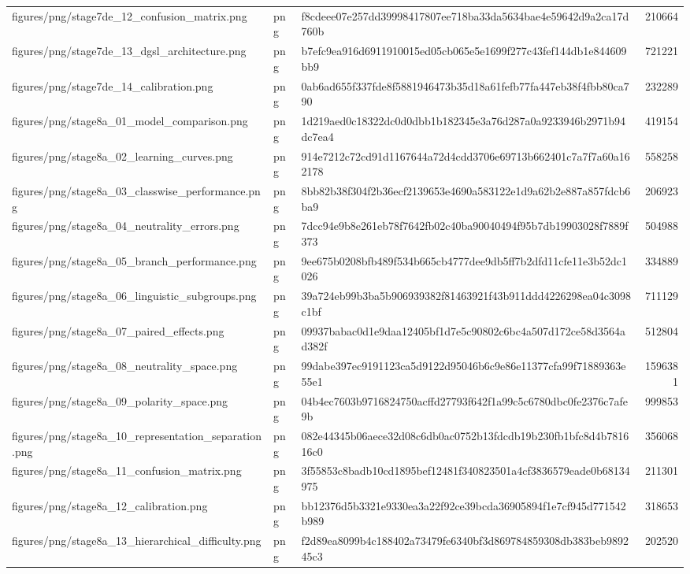 \begin{tabular}{lllr}
figures/png/stage7de_12_confusion_matrix.png & png & f8cdeee07e257dd39998417807ee718ba33da5634bae4e59642d9a2ca17d760b & 210664 \\
figures/png/stage7de_13_dgsl_architecture.png & png & b7efc9ea916d6911910015ed05cb065e5e1699f277c43fef144db1e844609bb9 & 721221 \\
figures/png/stage7de_14_calibration.png & png & 0ab6ad655f337fde8f5881946473b35d18a61fefb77fa447eb38f4fbb80ca790 & 232289 \\
figures/png/stage8a_01_model_comparison.png & png & 1d219aed0c18322dc0d0dbb1b182345e3a76d287a0a9233946b2971b94dc7ea4 & 419154 \\
figures/png/stage8a_02_learning_curves.png & png & 914e7212c72cd91d1167644a72d4cdd3706e69713b662401c7a7f7a60a162178 & 558258 \\
figures/png/stage8a_03_classwise_performance.png & png & 8bb82b38f304f2b36ecf2139653e4690a583122e1d9a62b2e887a857fdcb6ba9 & 206923 \\
figures/png/stage8a_04_neutrality_errors.png & png & 7dcc94e9b8e261eb78f7642fb02c40ba90040494f95b7db19903028f7889f373 & 504988 \\
figures/png/stage8a_05_branch_performance.png & png & 9ee675b0208bfb489f534b665cb4777dee9db5ff7b2dfd11cfe11e3b52dc1026 & 334889 \\
figures/png/stage8a_06_linguistic_subgroups.png & png & 39a724eb99b3ba5b906939382f81463921f43b911ddd4226298ea04c3098c1bf & 711129 \\
figures/png/stage8a_07_paired_effects.png & png & 09937babac0d1e9daa12405bf1d7e5c90802c6bc4a507d172ce58d3564ad382f & 512804 \\
figures/png/stage8a_08_neutrality_space.png & png & 99dabe397ec9191123ca5d9122d95046b6c9e86e11377cfa99f71889363e55e1 & 1596381 \\
figures/png/stage8a_09_polarity_space.png & png & 04b4ec7603b9716824750acffd27793f642f1a99c5c6780dbc0fe2376c7afe9b & 999853 \\
figures/png/stage8a_10_representation_separation.png & png & 082e44345b06aece32d08c6db0ac0752b13fdcdb19b230fb1bfc8d4b781616c0 & 356068 \\
figures/png/stage8a_11_confusion_matrix.png & png & 3f55853c8badb10cd1895bef12481f340823501a4cf3836579eade0b68134975 & 211301 \\
figures/png/stage8a_12_calibration.png & png & bb12376d5b3321e9330ea3a22f92ce39bcda36905894f1e7cf945d771542b989 & 318653 \\
figures/png/stage8a_13_hierarchical_difficulty.png & png & f2d89ea8099b4c188402a73479fe6340bf3d869784859308db383beb989245c3 & 202520 \\

\end{tabular}
